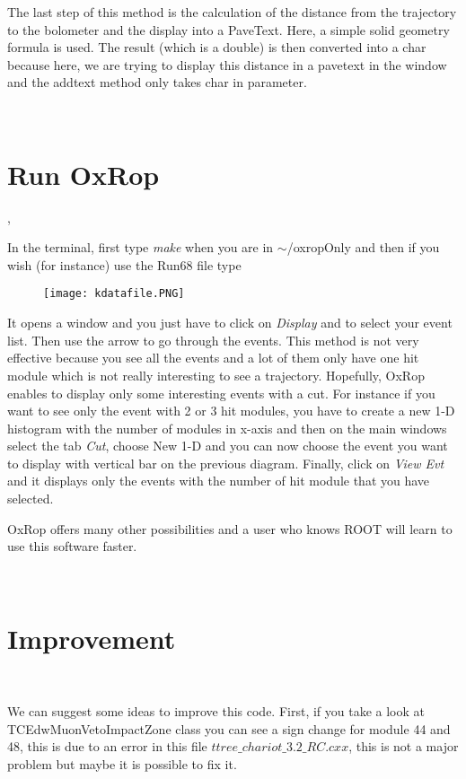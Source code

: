\documentclass[12pt, a4paper]{article}
\begin{document}
The last step of this method is the calculation of the distance from the trajectory to the bolometer and the display into a PaveText. Here, a simple solid geometry formula is used. The result (which is a double) is then converted into a char because here, we are trying to display this distance in a pavetext in the window and the addtext method only takes char in parameter. 

~


\section{Run OxRop}
,
~

In the terminal, first type \emph{make} when you are in  $ \sim $/oxropOnly and then if you wish (for instance) use the Run68 file type 

\begin{figure} [H]
\begin{center}
\texttt{[image: kdatafile.PNG]}
\end{center}
\end{figure}

It opens a window and you just have to click on \emph{Display} and to select your event list. Then use the arrow to go through the events. This method is not very effective because you see all the events and a lot of them only have one hit module which is not really interesting to see a trajectory. Hopefully, OxRop enables to display only some interesting events with a cut. For instance if you want to see only the event with 2 or 3 hit modules, you have to create a new 1-D histogram with the number of modules in x-axis and then on the main windows select the tab \emph{Cut}, choose New 1-D and you can now choose the event you want to display with vertical bar on the previous diagram. Finally, click on \emph{View Evt} and it displays only the events with the number of hit module that you have selected. 

OxRop offers many other possibilities and a user who knows ROOT will learn to use this software faster.

~


\section{Improvement}

~

We can suggest some ideas to improve this code. First, if you take a look at TCEdwMuonVetoImpactZone class you can see a sign change for module 44 and 48, this is due to an error in this file $ttree\_chariot\_3.2\_RC.cxx$, this is not a major problem but maybe it is possible to fix it. 
\end{document}
